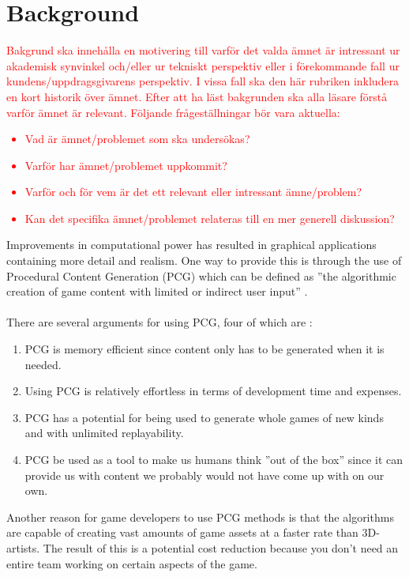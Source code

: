 \section{Background}
\textcolor{red}{
Bakgrund ska innehålla en motivering till varför det valda ämnet är intressant ur akademisk synvinkel och/eller ur tekniskt perspektiv eller i förekommande fall ur kundens/uppdragsgivarens perspektiv. I vissa fall ska den här rubriken inkludera en kort historik över ämnet. Efter att ha läst bakgrunden ska alla läsare förstå varför ämnet är relevant. Följande frågeställningar bör vara aktuella:
\begin{itemize}
    \item Vad är ämnet/problemet som ska undersökas?
    \item Varför har ämnet/problemet uppkommit?
    \item Varför och för vem är det ett relevant eller intressant ämne/problem?
    \item Kan det specifika ämnet/problemet relateras till en mer generell diskussion?
\end{itemize}
}


Improvements in computational power has resulted in graphical applications containing more detail and realism. One way to provide this is through the use of Procedural Content Generation (PCG) which can be defined as ''the algorithmic creation of game content with limited or indirect user input'' \cite[p. 1]{shaker2016procedural}.
\\\\
There are several arguments for using PCG, four of which are \cite[pp. 141-142]{search-based_pcg}:
\begin{enumerate}
    \item PCG is memory efficient since content only has to be generated when it is needed.
    \item Using PCG is relatively effortless in terms of development time and expenses.
    \item PCG has a potential for being used to generate whole games of new kinds and with unlimited replayability.
    \item PCG be used as a tool to make us humans think ''out of the box'' since it can provide us with content we probably would not have come up with on our own.
\end{enumerate}

Another reason for game developers to use PCG methods is that the algorithms are capable of creating vast amounts of game assets at a faster rate than 3D-artists. The result of this is a potential cost reduction because you don't need an entire team working on certain aspects of the game.

